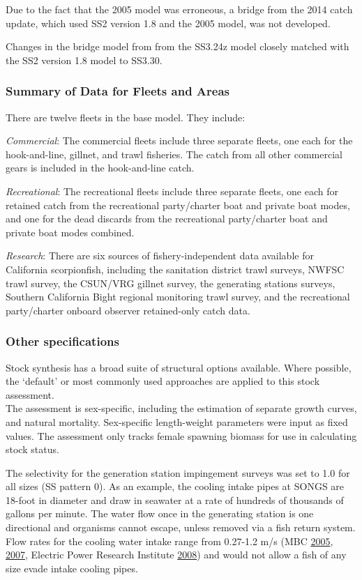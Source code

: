 \documentclass[12pt,]{article}
\begin{document}
Due to the fact that the 2005 model was erroneous, a bridge from the
2014 catch update, which used SS2 version 1.8 and the 2005 model, was
not developed.

Changes in the bridge model from from the SS3.24z model closely matched
with the SS2 version 1.8 model to SS3.30.

\subsubsection{Summary of Data for Fleets and
Areas}\label{summary-of-data-for-fleets-and-areas}

There are twelve fleets in the base model. They include:

\emph{Commercial}: The commercial fleets include three separate fleets,
one each for the hook-and-line, gillnet, and trawl fisheries. The catch
from all other commercial gears is included in the hook-and-line catch.

\emph{Recreational}: The recreational fleets include three separate
fleets, one each for retained catch from the recreational party/charter
boat and private boat modes, and one for the dead discards from the
recreational party/charter boat and private boat modes combined.

\emph{Research}: There are six sources of fishery-independent data
available for California scorpionfish, including the sanitation district
trawl surveys, NWFSC trawl survey, the CSUN/VRG gillnet survey, the
generating stations surveys, Southern California Bight regional
monitoring trawl survey, and the recreational party/charter onboard
observer retained-only catch data.

\subsubsection{Other specifications}\label{other-specifications}

Stock synthesis has a broad suite of structural options available. Where
possible, the `default' or most commonly used approaches are applied to
this stock assessment.\\
The assessment is sex-specific, including the estimation of separate
growth curves, and natural mortality. Sex-specific length-weight
parameters were input as fixed values. The assessment only tracks female
spawning biomass for use in calculating stock status.

The selectivity for the generation station impingement surveys was set
to 1.0 for all sizes (SS pattern 0). As an example, the cooling intake
pipes at SONGS are 18-foot in diameter and draw in seawater at a rate of
hundreds of thousands of gallons per minute. The water flow once in the
generating station is one directional and organisms cannot escape,
unless removed via a fish return system. Flow rates for the cooling
water intake range from 0.27-1.2 m/s (MBC
\protect\hyperlink{ref-MBC2005}{2005},
\protect\hyperlink{ref-MBC2007}{2007}, Electric Power Research Institute
\protect\hyperlink{ref-EPRI2008}{2008}) and would not allow a fish of
any size evade intake cooling pipes.
\end{document}
